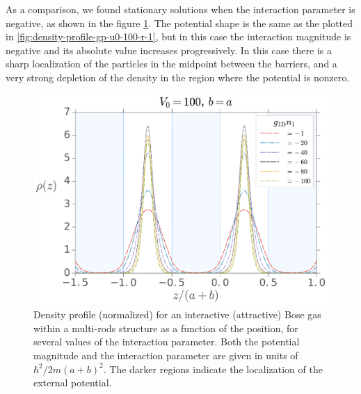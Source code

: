 As a comparison, we found stationary solutions when the interaction parameter is negative, as shown in the figure
\ref{fig:density-profile-gp-u0-100-r-1-attr}. The potential shape is the same as the plotted in
\ref{fig:density-profile-gp-u0-100-r-1}, but in this case the interaction magnitude is negative and its absolute value
increases progressively. In this case there is a sharp localization of the particles in the midpoint between the
barriers, and a very strong depletion of the density in the region where the potential is nonzero.
%
\begin{figure}[h!]
	\centering
	\includegraphics[width=0.75\linewidth]{./figures/density_profile_gp_u0-100_r-1_attr}
	\caption{
		Density profile (normalized) for an interactive (attractive) Bose gas within a multi-rods structure as
		a function of the position, for several values of the interaction parameter. Both the potential magnitude and
		the interaction parameter are given in units of $\hbar^2 / 2 m (a+b)^2$. The darker regions indicate the
		localization of the external potential.
	}
	\label{fig:density-profile-gp-u0-100-r-1-attr}
\end{figure}
%

